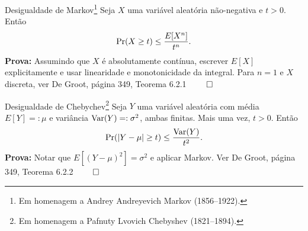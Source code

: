 \begin{frame}{Desigualdade de Markov\footnote{Em homenagem a Andrey Andreyevich Markov (1856–1922).}}
Seja $X$ uma variável aleatória não-negativa e $t > 0$.
Então
\begin{equation}
 \label{eq:Markov_ineq}
 \operatorname{Pr}(X \geq t) \leq \frac{E[X^n]}{t^n}.
\end{equation}
\textbf{Prova:} Assumindo que $X$ é absolutamente contínua, escrever $E[X]$ explicitamente e usar linearidade e monotonicidade da integral.
Para $n = 1$ e $X$ discreta, ver De Groot, página 349, Teorema 6.2.1 $\qed$
\end{frame}
\begin{frame}{Desigualdade de Chebychev\footnote{Em homenagem a Pafnuty Lvovich Chebyshev (1821--1894).}}
Seja $Y$ uma variável aleatória com média $E[Y] =: \mu$ e variância $\operatorname{Var}(Y) =: \sigma^2$, ambas finitas.
Mais uma vez, $t>0$.
Então
\begin{equation}
 \label{eq:Chebychev_ineq}
 \operatorname{Pr}(|Y-\mu| \geq t) \leq \frac{\operatorname{Var}(Y)}{t^2}.
\end{equation}
\textbf{Prova:} Notar que $E[(Y-\mu)^2] = \sigma^2$ e aplicar Markov.
Ver De Groot, página 349, Teorema 6.2.2 $\qed$
\end{frame}

